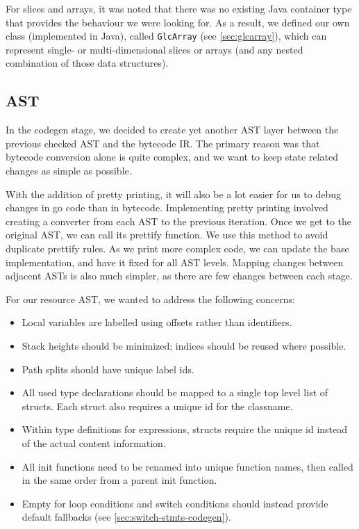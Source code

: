 \documentclass[11pt]{article}
\begin{document}
For slices and arrays, it was noted that there was no existing Java
container type that provides the behaviour we were looking for. As a
result, we defined our own class (implemented in Java), called
\texttt{GlcArray} (see \ref{sec:glcarray}), which can represent
single- or multi-dimensional slices or arrays (and any nested
combination of those data structures).

\subsection{AST}
\label{sec:resource-ast}

In the codegen stage, we decided to create yet another AST layer
between the previous checked AST and the bytecode IR. The primary
reason was that bytecode conversion alone is quite complex, and we
want to keep state related changes as simple as possible.

With the addition of pretty printing, it will also be a lot easier for
us to debug changes in go code than in bytecode.  Implementing pretty
printing involved creating a converter from each AST to the previous
iteration.  Once we get to the original AST, we can call its prettify
function.  We use this method to avoid duplicate prettify rules.  As
we print more complex code, we can update the base implementation, and
have it fixed for all AST levels.  Mapping changes between adjacent
ASTs is also much simpler, as there are few changes between each
stage.

For our resource AST, we wanted to address the following concerns:

\begin{itemize}
\item Local variables are labelled using offsets rather than
  identifiers.
\item Stack heights should be minimized; indices should be reused
  where possible.
\item Path splits should have unique label ids.
\item All used type declarations should be mapped to a single top
  level list of structs. Each struct also requires a unique id for the
  classname.
\item Within type definitions for expressions, structs require the
  unique id instead of the actual content information.
\item All init functions need to be renamed into unique function
  names, then called in the same order from a parent init function.
\item Empty for loop conditions and switch conditions should instead
  provide default fallbacks (see \ref{sec:switch-stmts-codegen}).
\end{itemize}
\end{document}
